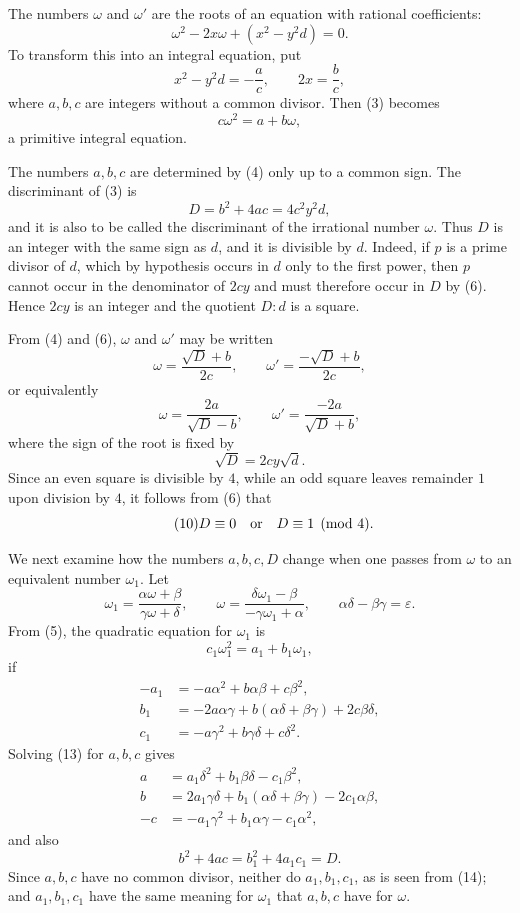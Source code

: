 \documentclass[11pt]{article}
\begin{document}
The numbers $\omega$ and $\omega'$ are the roots of an equation with rational coefficients:
\[
\tag{3}        \omega^2-2x\omega+(x^2-y^2d)=0.
\]
To transform this into an integral equation, put
\[
\tag{4}        x^2-y^2d=-\frac ac,
        \qquad
        2x=\frac bc,
\]
where $a,b,c$ are integers without a common divisor. Then (3) becomes
\[
\tag{5}        c\omega^2=a+b\omega,
\]
a primitive integral equation.

The numbers $a,b,c$ are determined by (4) only up to a common sign. The discriminant of (3) is
\[
\tag{6}        D=b^2+4ac=4c^2y^2d,
\]
and it is also to be called the discriminant of the irrational number $\omega$. Thus $D$ is an integer with the same sign as $d$, and it is divisible by $d$. Indeed, if $p$ is a prime divisor of $d$, which by hypothesis occurs in $d$ only to the first power, then $p$ cannot occur in the denominator of $2cy$ and must therefore occur in $D$ by (6). Hence $2cy$ is an integer and the quotient $D:d$ is a square.

From (4) and (6), $\omega$ and $\omega'$ may be written
\[
\tag{7}        \omega=\frac{\sqrt D+b}{2c},
        \qquad
        \omega'=\frac{-\sqrt D+b}{2c},
\]
or equivalently
\[
\tag{8}        \omega=\frac{2a}{\sqrt D-b},
        \qquad
        \omega'=\frac{-2a}{\sqrt D+b},
\]
where the sign of the root is fixed by
\[
\tag{9}        \sqrt D=2cy\sqrt d.
\]
Since an even square is divisible by $4$, while an odd square leaves remainder $1$ upon division by $4$, it follows from (6) that
\[
\tag{10}       D\equiv0\quad\hbox{or}\quad D\equiv1\pmod4.
\]

We next examine how the numbers $a,b,c,D$ change when one passes from $\omega$ to an equivalent number $\omega_1$. Let
\[
\tag{11}       \omega_1=\frac{\alpha\omega+\beta}{\gamma\omega+\delta},
        \qquad
        \omega=\frac{\delta\omega_1-\beta}{-\gamma\omega_1+\alpha},
        \qquad
        \alpha\delta-\beta\gamma=\varepsilon.
\]
From (5), the quadratic equation for $\omega_1$ is
\[
\tag{12}       c_1\omega_1^2=a_1+b_1\omega_1,
\]
if
\[
\tag{13}\begin{aligned}
-a_1&=-a\alpha^2+b\alpha\beta+c\beta^2,\\
 b_1&=-2a\alpha\gamma+b(\alpha\delta+\beta\gamma)+2c\beta\delta,\\
 c_1&=-a\gamma^2+b\gamma\delta+c\delta^2.
\end{aligned}
\]
Solving (13) for $a,b,c$ gives
\[
\tag{14}\begin{aligned}
 a&=a_1\delta^2+b_1\beta\delta-c_1\beta^2,\\
 b&=2a_1\gamma\delta+b_1(\alpha\delta+\beta\gamma)-2c_1\alpha\beta,\\
-c&=-a_1\gamma^2+b_1\alpha\gamma-c_1\alpha^2,
\end{aligned}
\]
and also
\[
\tag{15}       b^2+4ac=b_1^2+4a_1c_1=D.
\]
Since $a,b,c$ have no common divisor, neither do $a_1,b_1,c_1$, as is seen from (14); and $a_1,b_1,c_1$ have the same meaning for $\omega_1$ that $a,b,c$ have for $\omega$.
\end{document}
